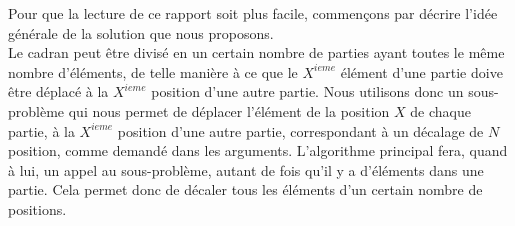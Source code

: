 Pour que la lecture de ce rapport soit plus facile, commençons par décrire l'idée générale de la solution que nous proposons. \\

Le cadran peut être divisé en un certain nombre de parties ayant toutes le même nombre d'éléments, de telle manière à ce que le $X^{ieme}$ élément d'une partie doive être déplacé à la $X^{ieme}$ position d'une autre partie. Nous utilisons donc un sous-problème qui nous permet de déplacer l'élément de la position $X$ de chaque partie, à la $X^{ieme}$ position d'une autre partie, correspondant à un décalage de $N$ position, comme demandé dans les arguments. L'algorithme principal fera, quand à lui, un appel au sous-problème, autant de fois qu'il y a d'éléments dans une partie. Cela permet donc de décaler tous les éléments d'un certain nombre de positions. \\